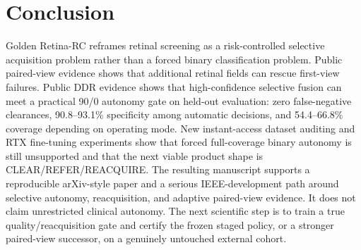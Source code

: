 \documentclass[journal]{IEEEtran}
\begin{document}
\section{Conclusion}
Golden Retina-RC reframes retinal screening as a risk-controlled selective acquisition problem rather than a forced binary classification problem. Public paired-view evidence shows that additional retinal fields can rescue first-view failures. Public DDR evidence shows that high-confidence selective fusion can meet a practical 90/0 autonomy gate on held-out evaluation: zero false-negative clearances, 90.8--93.1\% specificity among automatic decisions, and 54.4--66.8\% coverage depending on operating mode. New instant-access dataset auditing and RTX fine-tuning experiments show that forced full-coverage binary autonomy is still unsupported and that the next viable product shape is CLEAR/REFER/REACQUIRE. The resulting manuscript supports a reproducible arXiv-style paper and a serious IEEE-development path around selective autonomy, reacquisition, and adaptive paired-view evidence. It does not claim unrestricted clinical autonomy. The next scientific step is to train a true quality/reacquisition gate and certify the frozen staged policy, or a stronger paired-view successor, on a genuinely untouched external cohort.
\end{document}
